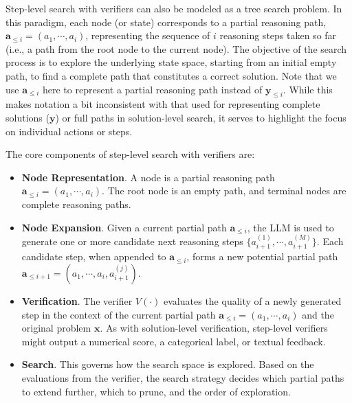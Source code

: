 Step-level search with verifiers can also be modeled as a tree search problem. In this paradigm, each node (or state) corresponds to a partial reasoning path, $\mathbf{a}_{\le i} = (a_1,\cdots,a_i)$, representing the sequence of $i$ reasoning steps taken so far (i.e., a path from the root node to the current node). The objective of the search process is to explore the underlying state space, starting from an initial empty path, to find a complete path that constitutes a correct solution. Note that we use $\mathbf{a}_{\le i}$ here to represent a partial reasoning path instead of $\mathbf{y}_{\le i}$. While this makes notation a bit inconsistent with that used for representing complete solutions ($\mathbf{y}$) or full paths in solution-level search, it serves to highlight the focus on individual actions or steps.

The core components of step-level search with verifiers are:

\begin{itemize}
\item \vspace{0.5em} \textbf{Node Representation}. A node is a partial reasoning path $\mathbf{a}_{\le i} = (a_1,\cdots,a_i)$. The root node is an empty path, and terminal nodes are complete reasoning paths.
\item \vspace{0.3em} \textbf{Node Expansion}. Given a current partial path $\mathbf{a}_{\le i}$, the LLM is used to generate one or more candidate next reasoning steps $\{a_{i+1}^{(1)},\cdots,a_{i+1}^{(M)}\}$. Each candidate step, when appended to $\mathbf{a}_{\le i}$, forms a new potential partial path $\mathbf{a}_{\le i + 1} = (a_1,\cdots,a_i,a_{i+1}^{(j)})$.
\item \vspace{0.3em} \textbf{Verification}. The verifier $V(\cdot)$ evaluates the quality of a newly generated step in the context of the current partial path $\mathbf{a}_{\le i} = (a_1,\cdots,a_i)$ and the original problem $\mathbf{x}$. As with solution-level verification, step-level verifiers might output a numerical score, a categorical label, or textual feedback.
\item \vspace{0.3em} \textbf{Search}. This governs how the search space is explored. Based on the evaluations from the verifier, the search strategy decides which partial paths to extend further, which to prune, and the order of exploration.
\end{itemize}
\vspace{0.5em}

